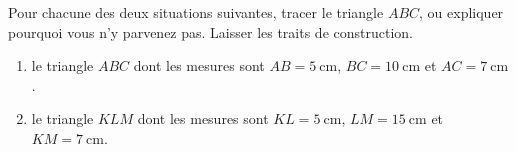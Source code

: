 
\begin{exercice}\label{exosmath-0975}

    Pour chacune des deux situations suivantes, tracer le triangle \( ABC\), ou expliquer pourquoi vous n'y parvenez pas. Laisser les traits de construction.
    \begin{enumerate}
        \item
            le triangle \( ABC\) dont les mesures sont \( AB=\SI{5}{\centi\meter}\), \( BC=\SI{10}{\centi\meter}\) et \( AC=\SI{7}{\centi\meter}\).
        \item
            le triangle \( KLM\) dont les mesures sont \( KL=\SI{5}{\centi\meter}\), \( LM=\SI{15}{\centi\meter}\) et \( KM=\SI{7}{\centi\meter}\).
    \end{enumerate}

\end{exercice}
